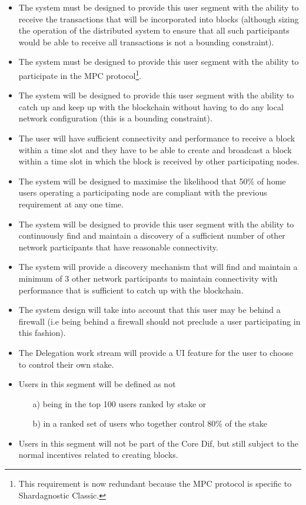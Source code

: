 \begin{itemize}
\item The system must be designed to provide this user segment with the ability to
      receive the transactions that will be incorporated into blocks (although
      sizing the operation of the distributed system to ensure that all such
      participants would be able to receive all transactions is not a bounding
      constraint).
\item The system must be designed to provide this user segment with the ability to
      participate in the MPC protocol\footnote{This requirement is now
      redundant because the MPC protocol is specific to Shardagnostic Classic.}.
\item The system will be designed to provide this user segment with the ability
      to catch up and keep up with the blockchain without having to do any local
      network configuration (this is a bounding constraint).
\item The user will have sufficient connectivity and performance to receive a
      block within a time slot {\sc and} they have to be able to create and
      broadcast a block within a time slot in which the block is received by
      other participating nodes.
\item The system will be designed to maximise the likelihood that 50\% of home
      users operating a participating node are compliant with the previous requirement
      at any one time.
\item The system will be designed to provide this user segment with the ability
      to continuously find and maintain a discovery of a sufficient number of
      other network participants that have reasonable connectivity.
\item The system will provide a discovery mechanism that will find and maintain
      a minimum of 3 other network participants to maintain connectivity with
      performance that is sufficient to catch up with the blockchain.
\item The system design will take into account that this user may be behind a
      firewall (i.e being behind a firewall should not preclude a user
      participating in this fashion).
\item The Delegation work stream will provide a UI feature for the user to
      choose to control their own stake.
\item Users in this segment will be defined as {\sc not}
      \begin{itemize}
      \item[a)] being in the top 100 users ranked by stake or
      \item[b)] in a ranked set of users who together control 80\% of the stake
      \end{itemize}
\item Users in this segment will not be part of the Core Dif, but still
      subject to the normal incentives related to creating blocks.
\end{itemize}



